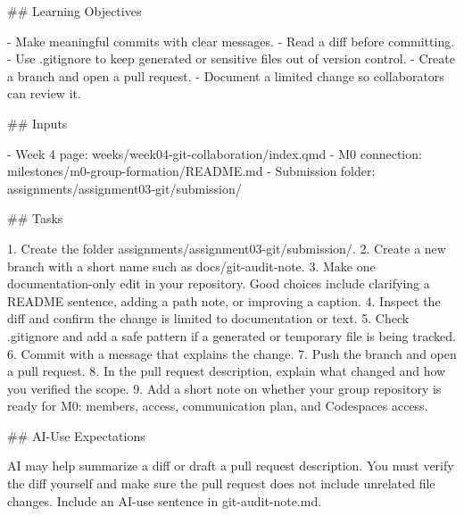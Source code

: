 \documentclass[
  letterpaper,
  DIV=11,
  numbers=noendperiod,
  oneside]{scrreprt}
\newenvironment{Shaded}{\begin{snugshade}}{\end{snugshade}}
\newcommand{\FunctionTok}[1]{\textcolor[rgb]{0.28,0.35,0.67}{#1}}
\newcommand{\InformationTok}[1]{\textcolor[rgb]{0.37,0.37,0.37}{#1}}
\newcommand{\NormalTok}[1]{\textcolor[rgb]{0.00,0.23,0.31}{#1}}
\newcommand{\SpecialStringTok}[1]{\textcolor[rgb]{0.13,0.47,0.30}{#1}}
\begin{document}
\begin{Shaded}
\begin{Highlighting}[numbers=left,,]
\FunctionTok{\#\# Learning Objectives}

\SpecialStringTok{{-} }\NormalTok{Make meaningful commits with clear messages.}
\SpecialStringTok{{-} }\NormalTok{Read a diff before committing.}
\SpecialStringTok{{-} }\NormalTok{Use }\InformationTok{\textasciigrave{}.gitignore\textasciigrave{}}\NormalTok{ to keep generated or sensitive files out of version control.}
\SpecialStringTok{{-} }\NormalTok{Create a branch and open a pull request.}
\SpecialStringTok{{-} }\NormalTok{Document a limited change so collaborators can review it.}

\FunctionTok{\#\# Inputs}

\SpecialStringTok{{-} }\NormalTok{Week 4 page: }\InformationTok{\textasciigrave{}weeks/week04{-}git{-}collaboration/index.qmd\textasciigrave{}}
\SpecialStringTok{{-} }\NormalTok{M0 connection: }\InformationTok{\textasciigrave{}milestones/m0{-}group{-}formation/README.md\textasciigrave{}}
\SpecialStringTok{{-} }\NormalTok{Submission folder: }\InformationTok{\textasciigrave{}assignments/assignment03{-}git/submission/\textasciigrave{}}

\FunctionTok{\#\# Tasks}

\SpecialStringTok{1. }\NormalTok{Create the folder }\InformationTok{\textasciigrave{}assignments/assignment03{-}git/submission/\textasciigrave{}}\NormalTok{.}
\SpecialStringTok{2. }\NormalTok{Create a new branch with a short name such as }\InformationTok{\textasciigrave{}docs/git{-}audit{-}note\textasciigrave{}}\NormalTok{.}
\SpecialStringTok{3. }\NormalTok{Make one documentation{-}only edit in your repository. Good choices include clarifying a README sentence, adding a path note, or improving a caption.}
\SpecialStringTok{4. }\NormalTok{Inspect the diff and confirm the change is limited to documentation or text.}
\SpecialStringTok{5. }\NormalTok{Check }\InformationTok{\textasciigrave{}.gitignore\textasciigrave{}}\NormalTok{ and add a safe pattern if a generated or temporary file is being tracked.}
\SpecialStringTok{6. }\NormalTok{Commit with a message that explains the change.}
\SpecialStringTok{7. }\NormalTok{Push the branch and open a pull request.}
\SpecialStringTok{8. }\NormalTok{In the pull request description, explain what changed and how you verified the scope.}
\SpecialStringTok{9. }\NormalTok{Add a short note on whether your group repository is ready for M0: members, access, communication plan, and Codespaces access.}

\FunctionTok{\#\# AI{-}Use Expectations}

\NormalTok{AI may help summarize a diff or draft a pull request description. You must verify the diff yourself and make sure the pull request does not include unrelated file changes. Include an AI{-}use sentence in }\InformationTok{\textasciigrave{}git{-}audit{-}note.md\textasciigrave{}}\NormalTok{.}


\end{Highlighting}
\end{Shaded}
\end{document}
